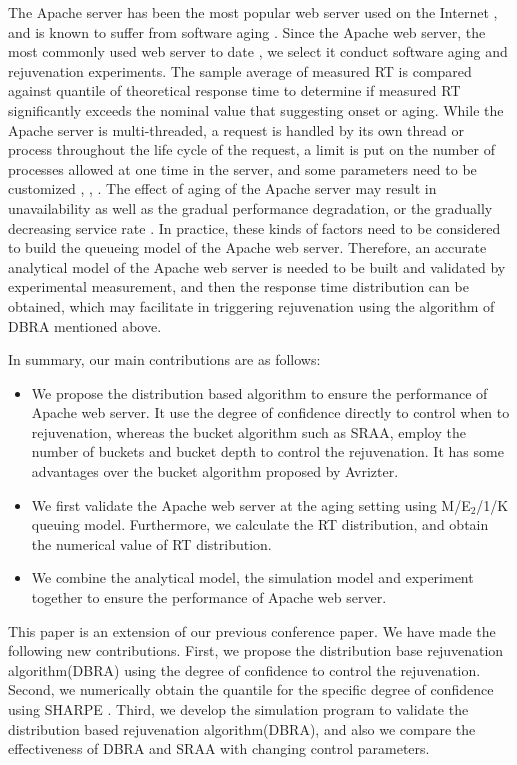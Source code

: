 \documentclass[10pt,journal,letterpaper,compsoc]{IEEEtran}
\begin{document}
The Apache server has been the most popular web server used on
the Internet \cite{ChScience:Apache},
and is known to suffer from software aging \cite{ChScience:MGrottke2006IEEEJR}.
Since the Apache web server, the most commonly used web server to
date \cite{ChScience:NetcraftWSSA} \cite{ChScience:MGrottke2006IEEEJR},
we select it conduct software aging and rejuvenation experiments.
The sample average of measured RT is compared against quantile of
theoretical response time to determine if measured RT significantly exceeds
the nominal value that suggesting onset or aging.
While the Apache server is multi-threaded,
a request is handled by its own thread or process throughout
the life cycle of the request, a limit is put on the number of processes
allowed at one time in the server, and some parameters need to be
customized \cite{ChScience:SGarg1998IEEEJC}, \cite{ChScience:YFJia2008ISSRE},
\cite{ChScience:JCao2003ICT}.
The effect of aging of the Apache server may result in unavailability
as well as the gradual performance degradation,
or the gradually decreasing service rate \cite{ChScience:SGarg1998IEEEJC}.
In practice, these kinds of factors need to be considered to build the
queueing model of the Apache web server.
Therefore, an accurate analytical model of the Apache web server is needed
to be built and validated by experimental measurement,
and then the response time distribution can be obtained,
which may facilitate in triggering rejuvenation using the algorithm of DBRA
mentioned above.

In summary, our main contributions are as follows:
\begin{itemize}
 \item We propose the distribution based algorithm to ensure the performance of Apache web server.
 It use the degree of confidence directly to control when to rejuvenation,
 whereas the bucket algorithm such as SRAA, employ the number of buckets and 
 bucket depth to control the rejuvenation.
 It has some advantages over the bucket algorithm proposed by Avrizter.    
 \item We first validate the Apache web server at the aging setting 
 using M/E$_2$/1/K queuing model. Furthermore, we calculate the RT distribution, 
 and obtain the numerical value of RT distribution.
 \item We combine the analytical model, the simulation model and experiment together to ensure the performance of Apache web server.
\end{itemize}

This paper is an extension of our previous conference paper\cite{ChScience:JingZhaoWoSAR11}. 
We have made the following new contributions. First, we propose the distribution base rejuvenation algorithm(DBRA) 
using the degree of confidence to control the rejuvenation. 
Second, we numerically obtain the quantile for the specific degree of confidence
using SHARPE \cite{ChScience:KSTrivedi2005ACM}.
Third, we develop the simulation program to validate the distribution based rejuvenation algorithm(DBRA),
and also we compare the effectiveness of DBRA and SRAA with changing control parameters.
\end{document}
